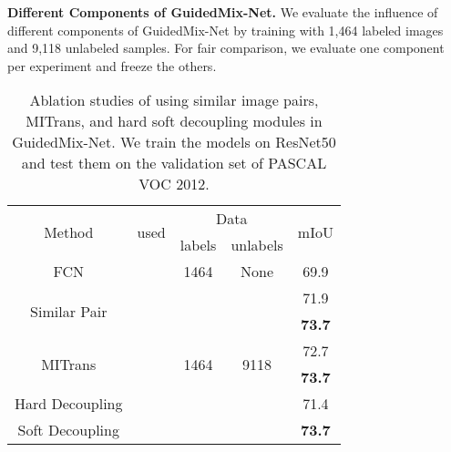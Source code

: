 \textbf{Different Components of GuidedMix-Net.}
We evaluate the influence of different components of GuidedMix-Net by training with 1,464 labeled images and 9,118 unlabeled samples.
For fair comparison, we evaluate one component per experiment and freeze the others.
\begin{table}[h]
\small
\centering
\caption{Ablation studies of using similar image pairs, MITrans, and hard  soft decoupling modules in GuidedMix-Net. 
We train the models on ResNet50 and test them on the validation set of PASCAL VOC 2012.}
\begin{tabular}{c|c|c|c|c}
\hline 
\multirow{2}{*}{Method} & \multirow{2}{*}{used} & \multicolumn{2}{c|}{Data} & \multirow{2}{*}{mIoU} \\\cline{3-4}
						&      &  labels   & unlabels        &                       \\\hline
FCN \cite{long2015fully}      &      &  1464     & None         & 69.9                       \\\hline
\multirow{2}{*}{Similar Pair} & & \multirow{7}{*}{1464} & \multirow{7}{*}{9118} & 71.9 \\
								&  &      &      & \textbf{73.7} \\\cline{1-2}\cline{5-5}
\multirow{2}{*}{MITrans}      & &      &      & 72.7 \\
								&  &      &      & \textbf{73.7} \\\cline{1-2}\cline{5-5}
Hard Decoupling               &  &      &      & 71.4 \\
Soft Decoupling               &  &      &      & \textbf{73.7} \\\hline
\end{tabular}
\label{ab_each-com}
\end{table}


